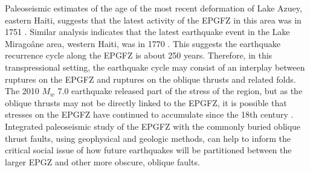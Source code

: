 \documentclass{nature}
\begin{document}
Paleoseismic estimates of the age of the most recent deformation of Lake Azuey, eastern Haiti, suggests that the latest activity of the EPGFZ in this area was in 1751 \citep{prentice2010seismic,bakun2012significant}. Similar analysis indicates that the latest earthquake event in the Lake Mirago\^ane area, western Haiti, was in 1770 \citep{bakun2012significant}. This suggests the earthquake recurrence cycle along the EPGFZ is about 250 years. Therefore, in this transpressional setting, the earthquake cycle may consist of an interplay between ruptures on the EPGFZ and ruptures on the oblique thrusts and related folds. The 2010 $M_w$ 7.0 earthquake released part of the stress of the region, but as the oblique thrusts may not be directly linked to the EPGFZ, it is possible that stresses on the EPGFZ have continued to accumulate since the 18th century \citep{prentice2010seismic}. Integrated paleoseismic study of the EPGFZ with the commonly buried oblique thrust faults, using geophysical and geologic methods, can help to inform the critical social issue of how future earthquakes will be partitioned between the larger EPGZ and other more obscure, oblique faults.
\end{document}
